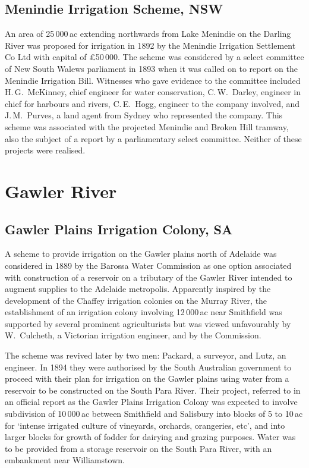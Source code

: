 \subsection*{Menindie Irrigation Scheme, NSW}

An area of 25\,000\,ac extending northwards from Lake Menindie on the
Darling River was proposed for irrigation in 1892 by the Menindie
Irrigation Settlement Co Ltd with capital of \pounds50\,000.  The
scheme was considered by a select committee of New South Walews
parliament in 1893 when it was called on to report on the Menindie
Irrigation Bill.  Witnesses who gave evidence to the committee
included H.\,G.~McKinney, chief engineer for water conservation,
C.\,W.~Darley, engineer in chief for harbours and rivers, C.\,E.~Hogg,
engineer to the company involved, and J.\,M.~Purves, a land agent from
Sydney who represented the company.  This scheme was associated with
the projected Menindie and Broken Hill tramway, also the subject of a
report by a parliamentary select committee.  Neither of these projects
were realised.

\section*{Gawler River}

\subsection*{Gawler Plains Irrigation Colony, SA}

A scheme to provide irrigation on the Gawler plains north of Adelaide
was considered in 1889 by the Barossa Water Commission as one option
associated with construction of a reservoir on a tributary of the
Gawler River intended to augment supplies to the Adelaide metropolis.
Apparently inspired by the development of the Chaffey irrigation
colonies on the Murray River, the establishment of an irrigation
colony involving 12\,000\,ac near Smithfield was supported by several
prominent agriculturists but was viewed unfavourably by W.~Culcheth, a
Victorian irrigation engineer, and by the Commission.

The scheme was revived later by two men: Packard, a surveyor, and
Lutz, an engineer.  In 1894 they were authorised by the South
Australian government to proceed with their plan for irrigation on the
Gawler plains using water from a reservoir to be constructed on the
South Para River.  Their project, referred to in an official report as
the Gawler Plains Irrigation Colony was expected to involve
subdivision of 10\,000\,ac between Smithfield and Salisbury into
blocks of 5 to 10\,ac for `intense irrigated culture of vineyards,
orchards, orangeries, etc', and into larger blocks for growth of
fodder for dairying and grazing purposes.   Water was to be
provided from a storage reservoir on the South Para River, with an
embankment near Williamstown.

